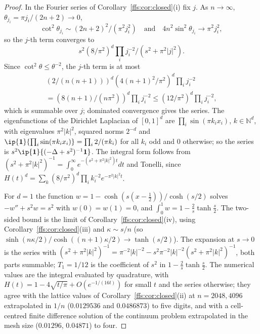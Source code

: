 \begin{proof}
In the Fourier series of Corollary~\ref{ffs:cor:closed}(i) fix $j$. As
$n\to\infty$, $\theta_{j_i}=\pi j_i/(2n+2)\to0$,
\[
\cot^2\theta_{j_i}\sim(2n+2)^2/(\pi^2j_i^2)\quad\text{and}\quad
4n^2\sin^2\theta_{j_i}\to\pi^2j_i^2,
\]
so the $j$-th term converges to
\[
s^2(8/\pi^2)^d\prod_ij_i^{-2}/(s^2+\pi^2\lvert j\rvert^2).
\]
Since $\cot^2\theta\le\theta^{-2}$, the $j$-th term is at most
\begin{multline*}
(2/(n(n+1)))^d(4(n+1)^2/\pi^2)^d\prod_ij_i^{-2}\\
=(8(n+1)/(n\pi^2))^d\prod_ij_i^{-2}\le(12/\pi^2)^d\prod_ij_i^{-2},
\end{multline*}
which is summable over $j$; dominated convergence gives the series. The eigenfunctions of the Dirichlet Laplacian of $[0,1]^d$
are $\prod_i\sin(\pi k_ix_i)$, $k\in\mathbb N^d$, with eigenvalues $\pi^2\lvert k
\rvert^2$, squared norms $2^{-d}$ and $\ip{\mathbf 1}{\prod_i\sin(\pi k_ix_i)}=
\prod_i2/(\pi k_i)$ for all $k_i$ odd and $0$ otherwise; so the series is
$s^2\ip{\mathbf 1}{(-\Delta+s^2)^{-1}\mathbf 1}$. The integral form follows
from $(s^2+\pi^2\lvert k\rvert^2)^{-1}=\int_0^\infty e^{-(s^2+\pi^2\lvert k
\rvert^2)t}dt$ and Tonelli, since $H(t)^d=\sum_k(8/\pi^2)^d\prod_ik_i^{-2}e^{-
\pi^2\lvert k\rvert^2t}$.

For $d=1$ the function $w=1-\cosh(s(x-\frac12))/\cosh(s/2)$ solves $-w''+s^2w=
s^2$ with $w(0)=w(1)=0$, and $\int_0^1w=1-\frac2s\tanh\frac s2$. The two-sided
bound is the limit of Corollary~\ref{ffs:cor:closed}(iv), using
Corollary~\ref{ffs:cor:closed}(iii) and $\kappa\sim s/n$ (so $\sinh(n\kappa/2)/
\cosh((n+1)\kappa/2)\to\tanh(s/2)$). The expansion at $s\to0$ is the series
with $(s^2+\pi^2\lvert k\rvert^2)^{-1}=\pi^{-2}\lvert k\rvert^{-2}-s^2\pi^{-2}
\lvert k\rvert^{-2}(s^2+\pi^2\lvert k\rvert^2)^{-1}$, both parts summable;
$T_1=1/12$ is the coefficient of $s^2$ in $1-\frac2s\tanh\frac s2$. The
numerical values are the integral evaluated by quadrature, with $H(t)=1-4\sqrt{
t/\pi}+O(e^{-1/(16t)})$ for small $t$ and the series otherwise; they agree
with the lattice values of Corollary~\ref{ffs:cor:closed}(ii) at $n=2048,4096$
extrapolated in $1/n$ ($0.0129536$ and $0.0486873$) to five digits, and with a
cell-centred finite difference solution of the continuum problem extrapolated
in the mesh size ($0.01296$, $0.04871$) to four.
\end{proof}

